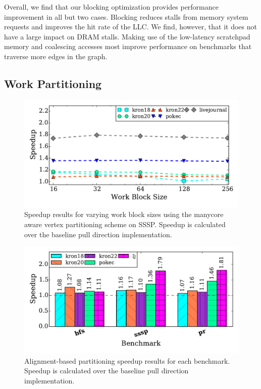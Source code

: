 Overall, we find that our blocking optimization provides performance improvement in all but two cases. 
Blocking reduces stalls from memory system requests and improves the hit rate of the LLC. We find, however, that it does not have a large impact on DRAM stalls.
Making use of the low-latency scratchpad memory and coalescing accesses most improve performance on benchmarks that traverse more edges in the graph. 
 
\subsection{Work Partitioning}
 
\begin{figure}[t]
    \centering
    \includegraphics[scale=0.5]{graphit-figures/sssp-cache.pdf}
    \caption{Speedup results for varying work block sizes using the manycore aware vertex partitioning scheme on SSSP. Speedup is calculated over the baseline pull direction implementation.}
    \label{pap:generals:sec:eval:fig:ssspcache}
\end{figure}
 
\begin{figure}[t]
    \centering
    \includegraphics[scale = 0.5]{graphit-figures/align.pdf}
    \caption{Alignment-based partitioning speedup results for each benchmark. Speedup is calculated over the baseline pull direction implementation.} %
    \label{pap:generals:sec:eval:fig:aligned}
    \vspace{-2mm} 
\end{figure}
 
